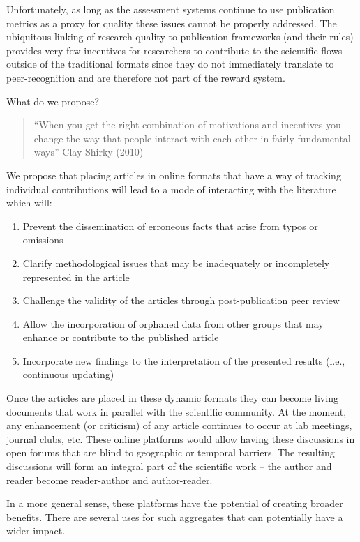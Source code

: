 \documentclass[final,authoryear,3p]{elsarticle-open-drafting}
\begin{document}
Unfortunately, as long as the assessment systems continue to use publication metrics as a proxy for quality these issues cannot be properly addressed. The ubiquitous linking of research quality to publication frameworks (and their rules) provides very few incentives for researchers to contribute to the scientific flows outside of the traditional formats since they do not immediately translate to peer-recognition and are therefore not part of the reward system. 

What do we propose?

\begin{quote}
“When you get the right combination of motivations and incentives you change the way that people interact with each other in fairly fundamental ways” Clay Shirky (2010)
\end{quote}

We propose that placing articles in online formats that have a way of tracking individual contributions will lead to a mode of interacting with the literature which will:

\begin{enumerate}
\item Prevent the dissemination of erroneous facts that arise from typos or omissions
\item Clarify methodological issues that may be inadequately or incompletely represented in the article
\item Challenge the validity of the articles through post-publication peer review
\item Allow the incorporation of orphaned data from other groups that may enhance or contribute to the published article
\item Incorporate new findings to the interpretation of the presented results (i.e., continuous updating)
\end{enumerate}

Once the articles are placed in these dynamic formats they can become living documents that work in parallel with the scientific community. At the moment, any enhancement (or criticism) of any article continues to occur at lab meetings, journal clubs, etc. These online platforms would allow having these discussions in open forums that are blind to geographic or temporal barriers. The resulting discussions will form an integral part of the scientific work – the author and reader become reader-author and author-reader.

In a more general sense, these platforms have the potential of creating broader benefits. There are several uses for such aggregates that can potentially have a wider impact. 
\end{document}
